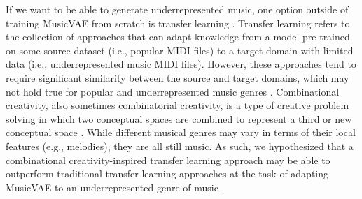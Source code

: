 \documentclass[letterpaper]{article}
\begin{document}
% 
If we want to be able to generate underrepresented music, one option outside of training MusicVAE from scratch is transfer learning \cite{tan2018survey}. Transfer learning refers to the collection of approaches that can adapt knowledge from a model pre-trained on some source dataset (i.e., popular MIDI files) to a target domain with limited data (i.e., underrepresented music MIDI files). 
However, these approaches tend to require significant similarity between the source and target domains, which may not hold true for popular and underrepresented music genres \cite{marchetti2021convolutional}. 
Combinational creativity, also sometimes combinatorial creativity, is a type of creative problem solving in which two conceptual spaces are combined to represent a third or new conceptual space \cite{boden2009computer}. 
While different musical genres may vary in terms of their local features (e.g., melodies), they are all still music. 
As such, we hypothesized that a combinational creativity-inspired transfer learning approach may be able to outperform traditional transfer learning approaches at the task of adapting MusicVAE to an underrepresented genre of music \cite{Mahajan2023}.


\end{document}
